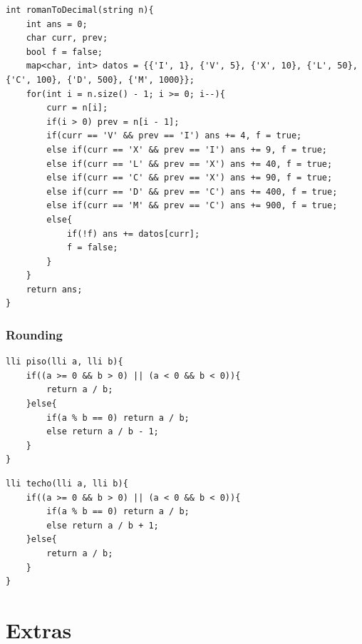 \documentclass[twoside]{article}
\begin{document}
\begin{multicols*}{2}
\begin{verbatim}
\end{verbatim}
\vspace{-12pt}
\begin{verbatim}
int romanToDecimal(string n){
	int ans = 0;
	char curr, prev;
	bool f = false;
	map<char, int> datos = {{'I', 1}, {'V', 5}, {'X', 10}, {'L', 50}, {'C', 100}, {'D', 500}, {'M', 1000}};
	for(int i = n.size() - 1; i >= 0; i--){
		curr = n[i];
		if(i > 0) prev = n[i - 1];
		if(curr == 'V' && prev == 'I') ans += 4, f = true;
		else if(curr == 'X' && prev == 'I') ans += 9, f = true;
		else if(curr == 'L' && prev == 'X') ans += 40, f = true;
		else if(curr == 'C' && prev == 'X') ans += 90, f = true;
		else if(curr == 'D' && prev == 'C') ans += 400, f = true;
		else if(curr == 'M' && prev == 'C') ans += 900, f = true;
		else{
			if(!f) ans += datos[curr];
			f = false;
		}
	}
	return ans;
}

\end{verbatim}

\subsubsectionfont{\large\bfseries\sffamily\underline}
\subsubsection*{Rounding}
\begin{verbatim}
lli piso(lli a, lli b){
	if((a >= 0 && b > 0) || (a < 0 && b < 0)){
		return a / b;
	}else{
		if(a % b == 0) return a / b;
		else return a / b - 1;
	}
}

\end{verbatim}
\vspace{-12pt}
\begin{verbatim}
lli techo(lli a, lli b){
	if((a >= 0 && b > 0) || (a < 0 && b < 0)){
		if(a % b == 0) return a / b;
		else return a / b + 1;
	}else{
		return a / b;
	}
}

\end{verbatim}

\sectionfont{\bfseries\sffamily\centering\Huge}
\vspace{1em}
\section*{Extras}
\vspace{3em}
\subsectionfont{\large\bfseries\sffamily\underline}

\end{multicols*}
\end{document}
